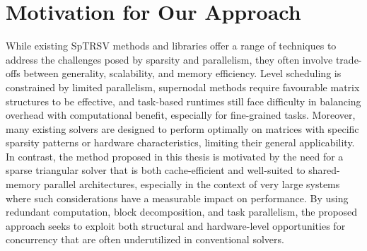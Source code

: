 \section{Motivation for Our Approach}
\label{chap:lr_motivation}
While existing SpTRSV methods and libraries offer a range of techniques to address the challenges posed by sparsity and parallelism, they often involve trade-offs between generality, scalability, and memory efficiency. Level scheduling is constrained by limited parallelism, supernodal methods require favourable matrix structures to be effective, and task-based runtimes still face difficulty in balancing overhead with computational benefit, especially for fine-grained tasks. Moreover, many existing solvers are designed to perform optimally on matrices with specific sparsity patterns or hardware characteristics, limiting their general applicability. In contrast, the method proposed in this thesis is motivated by the need for a sparse triangular solver that is both cache-efficient and well-suited to shared-memory parallel architectures, especially in the context of very large systems where such considerations have a measurable impact on performance. By using redundant computation, block decomposition, and task parallelism, the proposed approach seeks to exploit both structural and hardware-level opportunities for concurrency that are often underutilized in conventional solvers.

